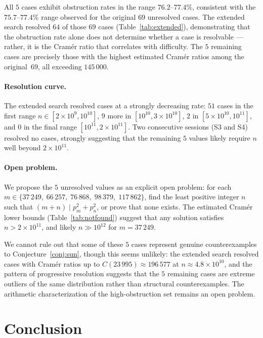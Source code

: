 \documentclass{amsart}
\theoremstyle{definition}
\theoremstyle{remark}
\numberwithin{equation}{section}
\begin{document}
All $5$ cases exhibit obstruction rates in the range $76.2$--$77.4\%$,
consistent with the $75.7$--$77.4\%$ range observed for the original
$69$ unresolved cases.
The extended search resolved $64$ of those $69$ cases
(Table~\ref{tab:extended}), demonstrating that the obstruction rate
alone does not determine whether a case is resolvable --- rather, it is
the Cram\'er ratio that correlates with difficulty.
The $5$ remaining cases are precisely those with the highest estimated
Cram\'er ratios among the original~$69$, all exceeding $145\,000$.

\paragraph{Resolution curve.}
The extended search resolved cases at a strongly decreasing rate:
$51$ cases in the first range $n \in [2 \times 10^9, 10^{10}]$,
$9$ more in $[10^{10}, 3 \times 10^{10}]$,
$2$ in $[5 \times 10^{10}, 10^{11}]$,
and $0$ in the final range $[10^{11}, 2 \times 10^{11}]$.
Two consecutive sessions (S3 and S4) resolved no cases,
strongly suggesting that the remaining $5$ values likely require
$n$ well beyond $2 \times 10^{11}$.

\paragraph{Open problem.}
We propose the $5$ unresolved values as an explicit open problem:
for each $m \in \{37\,249,\; 66\,257,\; 76\,868,\; 98\,379,\;
117\,862\}$, find the least positive integer $n$ such that
$(m+n) \mid p_m^2 + p_n^2$, or prove that none exists.
The estimated Cram\'er lower bounds (Table~\ref{tab:notfound}) suggest
that any solution satisfies $n > 2 \times 10^{11}$, and likely
$n \gg 10^{12}$ for $m = 37\,249$.

We cannot rule out that some of these $5$ cases represent genuine
counterexamples to Conjecture~\ref{conj:sun}, though this seems
unlikely: the extended search resolved cases with Cram\'er ratios up to
$C(23\,995) \approx 196\,577$ at $n \approx 4.8 \times 10^{10}$, and the
pattern of progressive resolution suggests that the $5$ remaining
cases are extreme outliers of the same distribution rather than
structural counterexamples.
The arithmetic characterization of the high-obstruction set remains an
open problem.

\section{Conclusion}
\end{document}
